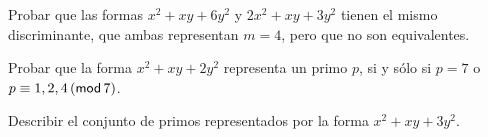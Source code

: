 \begin{ejerRepresentaciones}
	Probar que las formas
	$x^2+xy+6y^2$ y $2x^2+xy+3y^2$ tienen el mismo discriminante,
	que ambas representan $m=4$, pero que no son equivalentes.
\end{ejerRepresentaciones}

\begin{ejerRepresentaciones}
	Probar que la forma $x^2+xy+2y^2$ representa un primo $p$,
	si y s\'olo si $p=7$ o $p\equiv 1,2,4\tmodulo[7]$.
\end{ejerRepresentaciones}

\begin{ejerRepresentaciones}
	Describir el conjunto de primos representados por la forma
	$x^2+xy+3y^2$.
\end{ejerRepresentaciones}

